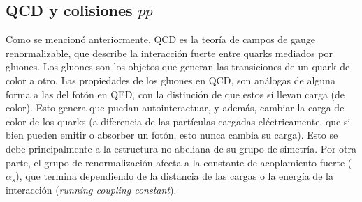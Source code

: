 



\subsection{QCD y colisiones $pp$}\label{sec:qcd_pp}

Como se mencionó anteriormente, QCD \cite{qcd_collider, Tripiana:1433788} es la teoría de campos de gauge renormalizable,
que describe la interacción fuerte entre quarks mediados por gluones. Los gluones son los objetos que generan las transiciones de un quark de color a otro. Las propiedades de los gluones en QCD, son análogas de alguna forma a las del fotón en QED, con la distinción de que estos sí llevan carga (de color). Esto genera que puedan autointeractuar, y además, cambiar la carga de color de los quarks (a diferencia de las partículas cargadas eléctricamente, que si bien pueden emitir o absorber un fotón, esto nunca cambia su carga). Esto se debe principalmente a la estructura no abeliana de su grupo de simetría.
Por otra parte, el grupo de renormalización afecta a la constante de acoplamiento fuerte ($\alpha_s$), que termina dependiendo de la distancia de las cargas o la energía de la interacción (\textit{running coupling constant}). 

